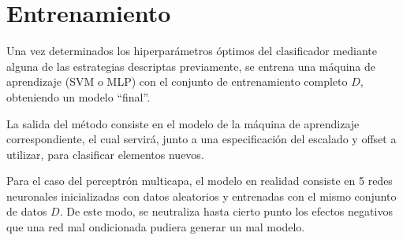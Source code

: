 \section{Entrenamiento}
Una vez determinados los hiperparámetros óptimos del clasificador
mediante alguna de las estrategias descriptas previamente, se entrena
una máquina de aprendizaje (SVM o MLP) con el conjunto de
entrenamiento completo $D$, obteniendo un modelo ``final''.

La salida del método consiste en el modelo de la máquina de
aprendizaje correspondiente, el cual servirá, junto a una
especificación del escalado y offset a utilizar, para clasificar
elementos nuevos.

Para el caso del perceptrón multicapa, el modelo en realidad
consiste en 5 redes neuronales inicializadas con datos aleatorios
y entrenadas con el mismo conjunto de datos $D$.
De este modo, se neutraliza hasta cierto punto los efectos negativos
que una red mal ondicionada pudiera generar un mal modelo.